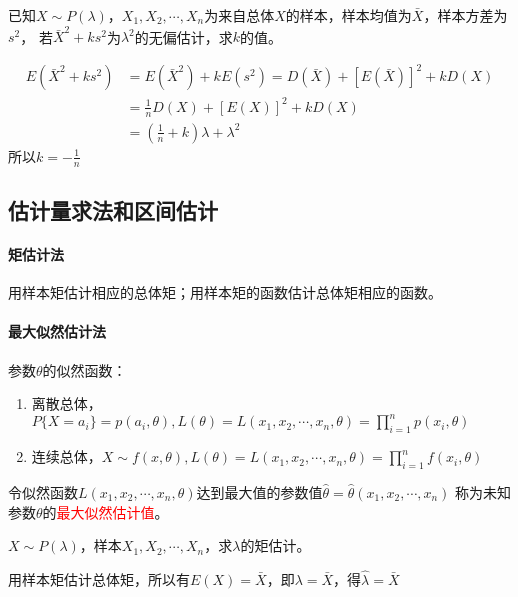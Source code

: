 \begin{example}
    已知$X\sim P(\lambda)$，$X_1,X_2,\cdots,X_n$为来自总体$X$的样本，样本均值为$\bar{X}$，样本方差为$s^2$，
    若$\bar{X}^2+ks^2$为$\lambda^2$的无偏估计，求$k$的值。
\end{example}
\begin{solution}
    \begin{align*}
        E\left(\bar{X}^2 + ks^2\right)
         & = E\left(\bar{X}^2\right) + kE\left(s^2\right)
        = D\left(\bar{X}\right) + \left[E\left(\bar{X}\right)\right]^2 + kD(X) \\
         & = \frac{1}{n}D(X) + \left[E(X)\right]^2 + kD(X)                     \\
         & =(\frac{1}{n}+k)\lambda + \lambda^2
    \end{align*}
    所以$k=-\frac{1}{n}$
\end{solution}

\subsection{估计量求法和区间估计}
\paragraph{矩估计法} 用样本矩估计相应的总体矩；用样本矩的函数估计总体矩相应的函数。

\paragraph{最大似然估计法}
参数$\theta$的似然函数：
\begin{enumerate}[(1)]
    \item 离散总体，$P\{X=a_i\} = p(a_i,\theta), L(\theta) = L(x_1,x_2,\cdots,x_n,\theta) = \prod_{i=1}^n p(x_i,\theta)$
    \item 连续总体，$X\sim f(x,\theta), L(\theta)=L(x_1,x_2,\cdots,x_n,\theta)=\prod_{i=1}^n f(x_i,\theta)$
\end{enumerate}
令似然函数$L(x_1,x_2,\cdots,x_n,\theta)$达到最大值的参数值$\hat{\theta} = \hat{\theta}(x_1,x_2,\cdots,x_n)$
称为未知参数$\theta$的\textcolor{red}{最大似然估计值}。

\begin{example}
    $X\sim P(\lambda)$，样本$X_1,X_2,\cdots,X_n$，求$\lambda$的矩估计。
\end{example}
\begin{solution}
    用样本矩估计总体矩，所以有$E(X)=\bar{X}$，即$\lambda=\bar{X}$，得$\hat{\lambda} = \bar{X}$
\end{solution}


